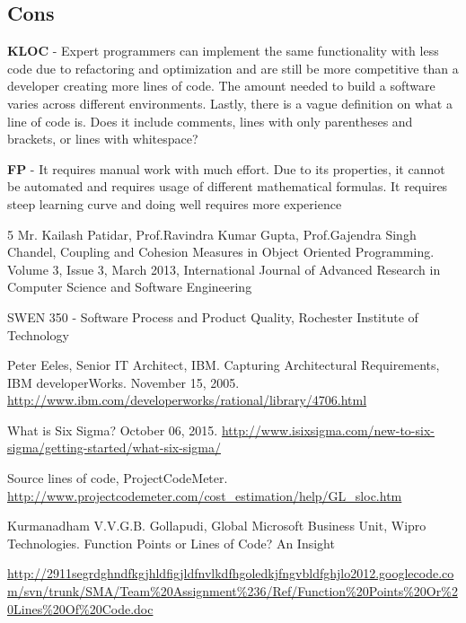 \documentclass[a4paper, 11pt]{article}
\begin{document}
\subsection{Cons}
\textbf{KLOC} - Expert programmers can implement the same functionality with less code due to refactoring and optimization and are still be more competitive than a developer creating more lines of code. The amount needed to build a software varies across different environments. Lastly, there is a vague definition on what a line of code is. Does it include comments, lines with only parentheses and brackets, or lines with whitespace?

\textbf{FP} - It requires manual work with much effort. Due to its properties, it cannot be automated and requires usage of different mathematical formulas. It requires steep learning curve and doing well requires more experience

\begin{thebibliography}{5}
	Mr. Kailash Patidar, Prof.Ravindra Kumar Gupta, Prof.Gajendra Singh Chandel,
	Coupling and Cohesion Measures in Object Oriented
	Programming.
	Volume 3, Issue 3, March 2013,
	International Journal of Advanced Research in
	Computer Science and Software Engineering
	
	SWEN 350 - Software Process and Product Quality,
	Rochester Institute of Technology
	
	Peter Eeles, Senior IT Architect, IBM.
	Capturing Architectural Requirements,
	IBM developerWorks.
	November 15, 2005.
	\url{http://www.ibm.com/developerworks/rational/library/4706.html}
	
	What is Six Sigma?
	October 06, 2015.
	\url{http://www.isixsigma.com/new-to-six-sigma/getting-started/what-six-sigma/}
	
	Source lines of code,
	ProjectCodeMeter.
	\url{http://www.projectcodemeter.com/cost_estimation/help/GL_sloc.htm}
	
	Kurmanadham V.V.G.B. Gollapudi,
	Global Microsoft Business Unit,
	Wipro Technologies.
	Function Points or Lines of Code? An Insight
	
	\url{http://2911segrdghndfkgjhldfigjldfnvlkdfhgoledkjfngvbldfghjlo2012.googlecode.com/svn/trunk/SMA/Team\%20Assignment\%236/Ref/Function\%20Points\%20Or\%20Lines\%20Of\%20Code.doc}
\end{thebibliography}
\end{document}
